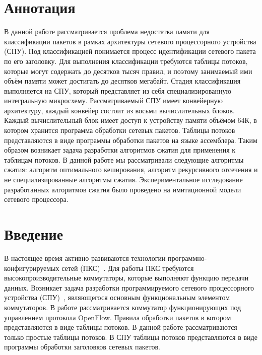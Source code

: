 \documentclass[oneside,final,12pt]{extarticle}
\begin{document}

    \section*{Аннотация}
        В данной работе рассматривается проблема недостатка памяти для классификации пакетов в рамках архитектуры сетевого процессорного устройства (СПУ). 
        Под классификацией понимается процесс идентификации сетевого пакета по его заголовку.
        Для выполнения классификации требуются таблицы потоков, которые могут содержать до десятков тысяч правил, и поэтому занимаемый ими объём памяти может достигать до десятков мегабайт. 
        Стадия классификация выполняется на СПУ, который представляет из себя специализированную интегральную микросхему. Рассматриваемый СПУ имеет
        конвейерную архитектуру, каждый конвейер состоит из восьми вычислительных блоков. Каждый вычислительный блок имеет доступ к устройству памяти объёмом 64К, 
        в котором хранится программа обработки сетевых пакетов. Таблицы потоков представляются в виде программы обработки пакетов на языке ассемблера. 
        Таким образом возникает задача разработки алгоритмов сжатия для применения к таблицам потоков.  В данной работе мы рассматривали следующие алгоритмы сжатия: 
        алгоритм оптимального кеширования, алгоритм рекурсивного отсечения и не специализированные алгоритмы сжатия. 
        Экспериментальное исследование разработанных алгоритмов сжатия было проведено на имитационной модели сетевого процессора.
    \newpage
    \tableofcontents
    \newpage

    \section*{Введение}
        В настоящее время активно развиваются технологии программно-конфигурируемых 
        сетей (ПКС)~\cite{smel_sdn}. Для работы ПКС требуются высокопроизводительные коммутаторы, 
        которые выполняют функцию передачи данных. Возникает задача разработки программируемого 
        сетевого процессорного устройства (СПУ)~\cite{scenarios}, являющегося основным 
        функциональным элементом коммутаторов. В работе рассматривается коммутатор 
        функционирующих под управлением протокола OpenFlow. Правила обработки пакетов 
        в котором представляются в виде таблицы потоков. В данной работе рассматриваются 
        только простые таблицы потоков. В СПУ таблицы потоков представляются 
        в виде программы обработки заголовков сетевых пакетов.
\end{document}
